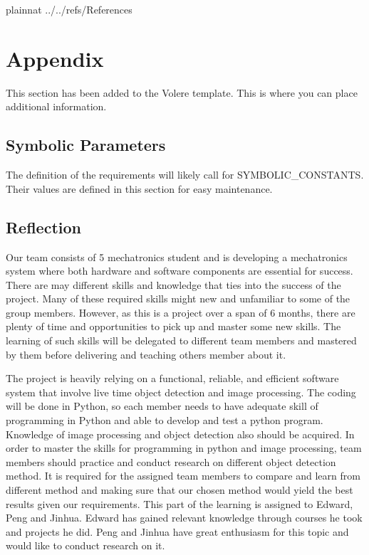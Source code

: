 \documentclass[12pt]{article}
\begin{document}
\newpage

 {plainnat}
 {../../refs/References}

\newpage

\section{Appendix}

This section has been added to the Volere template.  This is where you can place
additional information.

\subsection{Symbolic Parameters}

The definition of the requirements will likely call for SYMBOLIC\_CONSTANTS.
Their values are defined in this section for easy maintenance.

\subsection{Reflection}

Our team consists of 5 mechatronics student and is developing a mechatronics system where both hardware and software components are essential for success. There are may different skills and knowledge that ties into the success of the project. Many of these required skills might new and unfamiliar to some of the group members. However, as this is a project over a span of 6 months, there are plenty of time and opportunities to pick up and master some new skills. The learning of such skills will be delegated to different team members and mastered by them before delivering and teaching others member about it.  

The project is heavily relying on a functional, reliable, and efficient software system that involve live time object detection and image processing. The coding will be done in Python, so each member needs to have adequate skill of programming in Python and able to develop and test a python program. Knowledge of image processing and object detection also should be acquired.  In order to master the skills for programming in python and image processing, team members should practice and conduct research on different object detection method. It is required for the assigned team members to compare and learn from different method and making sure that our chosen method would yield the best results given our requirements. This part of the learning is assigned to Edward, Peng and Jinhua. Edward has gained relevant knowledge through courses he took and projects he did. Peng and Jinhua have great enthusiasm for this topic and would like to conduct research on it. 
\end{document}
